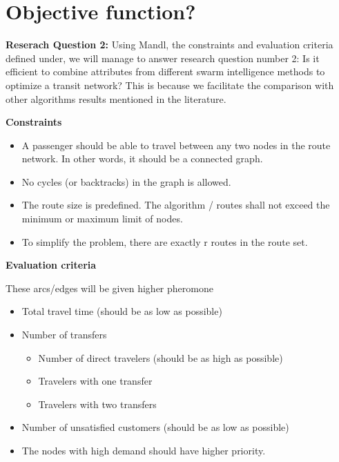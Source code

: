 \section{Objective function?}
\textbf{Reserach Question 2: }
Using Mandl, the constraints and evaluation criteria defined under, we will manage to answer research question number 2: Is it efficient to combine attributes from different swarm intelligence methods to optimize a transit network? This is because we facilitate the comparison with other algorithms results mentioned in the literature. 

\textbf{Constraints}
\begin{itemize}
\item A passenger should be able to travel between any two nodes in the route network. In other words, it should be a connected graph. 
\item No cycles (or backtracks) in the graph is allowed.
\item The route size is predefined. The algorithm / routes shall not exceed the minimum or maximum limit of nodes.
\item To simplify the problem, there are exactly r routes in the route set.
\end{itemize}

\textbf{Evaluation criteria}
\par
These arcs/edges will be given higher pheromone
\begin{itemize}
\item Total travel time (should be as low as possible)
\item Number of transfers
\begin{itemize}
\item Number of direct travelers (should be as high as possible)
\item Travelers with one transfer
\item Travelers with two transfers
\end{itemize}
\item Number of unsatisfied customers (should be as low as possible)
\item The nodes with high demand should have higher priority.
\end{itemize}

